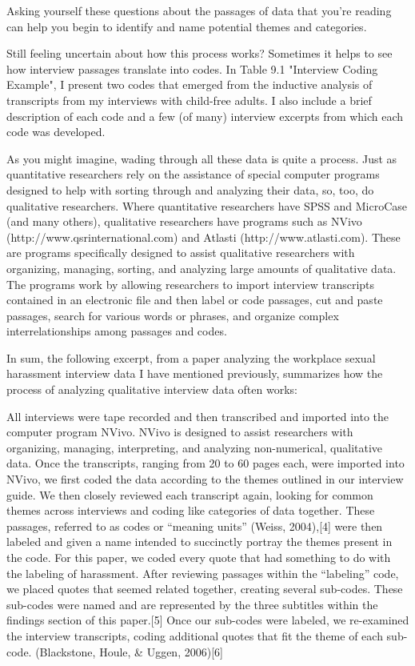Asking yourself these questions about the passages of data that you’re reading can help you begin to identify and name potential themes and categories.

Still feeling uncertain about how this process works? Sometimes it helps to see how interview passages translate into codes. In Table 9.1 "Interview Coding Example", I present two codes that emerged from the inductive analysis of transcripts from my interviews with child-free adults. I also include a brief description of each code and a few (of many) interview excerpts from which each code was developed.

As you might imagine, wading through all these data is quite a process. Just as quantitative researchers rely on the assistance of special computer programs designed to help with sorting through and analyzing their data, so, too, do qualitative researchers. Where quantitative researchers have SPSS and MicroCase (and many others), qualitative researchers have programs such as NVivo (http://www.qsrinternational.com) and Atlasti (http://www.atlasti.com). These are programs specifically designed to assist qualitative researchers with organizing, managing, sorting, and analyzing large amounts of qualitative data. The programs work by allowing researchers to import interview transcripts contained in an electronic file and then label or code passages, cut and paste passages, search for various words or phrases, and organize complex interrelationships among passages and codes.

In sum, the following excerpt, from a paper analyzing the workplace sexual harassment interview data I have mentioned previously, summarizes how the process of analyzing qualitative interview data often works:

All interviews were tape recorded and then transcribed and imported into the computer program NVivo. NVivo is designed to assist researchers with organizing, managing, interpreting, and analyzing non-numerical, qualitative data. Once the transcripts, ranging from 20 to 60 pages each, were imported into NVivo, we first coded the data according to the themes outlined in our interview guide. We then closely reviewed each transcript again, looking for common themes across interviews and coding like categories of data together. These passages, referred to as codes or “meaning units” (Weiss, 2004),[4] were then labeled and given a name intended to succinctly portray the themes present in the code. For this paper, we coded every quote that had something to do with the labeling of harassment. After reviewing passages within the “labeling” code, we placed quotes that seemed related together, creating several sub-codes. These sub-codes were named and are represented by the three subtitles within the findings section of this paper.[5] Once our sub-codes were labeled, we re-examined the interview transcripts, coding additional quotes that fit the theme of each sub-code. (Blackstone, Houle, \& Uggen, 2006)[6]

